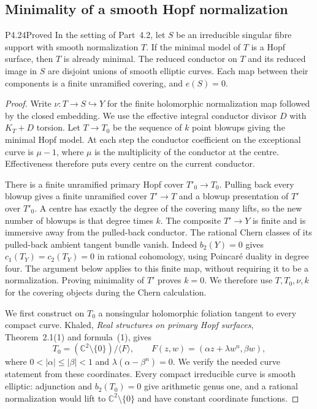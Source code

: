 \subsection{Minimality of a smooth Hopf normalization}

\begin{statement}{P4.24}{Proved}
In the setting of Part~4.2, let $S$ be an irreducible
singular fibre support with smooth normalization $T$.
If the minimal model of $T$ is a Hopf surface, then
$T$ is already minimal. The reduced conductor on $T$
and its reduced image in $S$ are disjoint unions of
smooth elliptic curves. Each map between their
components is a finite unramified covering, and
$e(S)=0$.
\end{statement}
\begin{proof}
Write $\nu:T\to S\hookrightarrow Y$ for the finite
holomorphic normalization map followed by the closed
embedding. We use the effective integral conductor
divisor $D$ with $K_T+D$ torsion. Let $T\to T_0$
be the sequence of $k$ point blowups giving the
minimal Hopf model. At each step the conductor
coefficient on the exceptional curve is $\mu-1$,
where $\mu$ is the multiplicity of the conductor
at the centre. Effectiveness therefore puts every
centre on the current conductor.

There is a finite unramified primary Hopf cover
$T'_0\to T_0$. Pulling back every blowup gives a
finite unramified cover $T'\to T$ and a blowup
presentation of $T'$ over $T'_0$. A centre has
exactly the degree of the covering many lifts,
so the new number of blowups is that degree times
$k$. The composite $T'\to Y$ is finite and is
immersive away from the pulled-back conductor.
The rational Chern classes of its pulled-back
ambient tangent bundle vanish. Indeed $b_2(Y)=0$
gives $c_1(T_Y)=c_2(T_Y)=0$ in rational cohomology,
using Poincar\'e duality in degree four. The
argument below applies to this finite map, without
requiring it to be a normalization. Proving
minimality of $T'$ proves $k=0$. We therefore use
$T,T_0,\nu,k$ for the covering objects during the
Chern calculation.

We first construct on $T_0$ a nonsingular
holomorphic foliation tangent to every compact
curve. Khaled, \emph{Real structures on primary
Hopf surfaces}, Theorem~2.1(1) and formula~(1),
gives
\[
 T_0=(\mathbb C^2\setminus\{0\})/\langle F\rangle,
 \qquad F(z,w)=(\alpha z+\lambda w^n,\beta w),
\]
where $0<|\alpha|\le|\beta|<1$ and
$\lambda(\alpha-\beta^n)=0$. We verify the needed
curve statement from these coordinates. Every
compact irreducible curve is smooth elliptic:
adjunction and $b_2(T_0)=0$ give arithmetic genus
one, and a rational normalization would lift to
$\mathbb C^2\setminus\{0\}$ and have constant
coordinate functions.


\end{proof}
